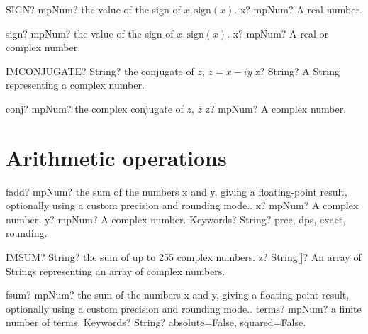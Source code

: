 \documentclass[12pt,a4paper,openany]{book}
\begin{document}
\begin{mpFunctionsExtract}
\mpWorksheetFunctionOneNotImplemented
{SIGN? mpNum? the value of the sign of $x, \text{sign}(x)$.}
{x? mpNum? A real number.}
\end{mpFunctionsExtract}

\begin{mpFunctionsExtract}
\mpFunctionOne
{sign? mpNum? the value of the sign of $x, \text{sign}(x)$.}
{x? mpNum? A real or complex number.}
\end{mpFunctionsExtract}

\begin{mpFunctionsExtract}
\mpWorksheetFunctionOneNotImplemented
{IMCONJUGATE? String? the conjugate of $z$, $\overline{z}=x-iy$}
{z? String? A String representing a complex number.}
\end{mpFunctionsExtract}

\begin{mpFunctionsExtract}
\mpFunctionOne
{conj? mpNum? the complex conjugate of $z$, $\overline{z}$}
{z? mpNum? A complex number.}
\end{mpFunctionsExtract}

\section{Arithmetic operations}

\begin{mpFunctionsExtract}
\mpFunctionThree
{fadd? mpNum? the sum of the numbers x and y, giving a floating-point result, optionally using a custom precision and rounding mode..}
{x? mpNum? A complex number.}
{y? mpNum? A complex number.}
{Keywords? String? prec, dps, exact, rounding.}
\end{mpFunctionsExtract}

\begin{mpFunctionsExtract}
\mpWorksheetFunctionOneNotImplemented
{IMSUM? String? the sum of up to 255 complex numbers.}
{z? String[]? An array of Strings representing an array of complex numbers.}
\end{mpFunctionsExtract}

\begin{mpFunctionsExtract}
\mpFunctionTwo
{fsum? mpNum? the sum of the numbers x and y, giving a floating-point result, optionally using a custom precision and rounding mode..}
{terms? mpNum? a finite number of terms.}
{Keywords? String? absolute=False, squared=False.}
\end{mpFunctionsExtract}
\end{document}
